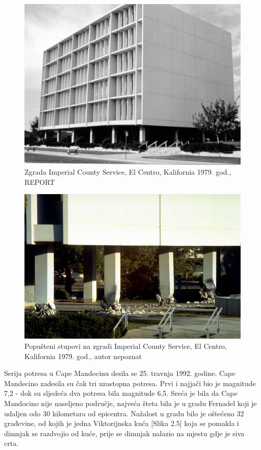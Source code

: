 \documentclass[12pt]{book}
\begin{document}
\begin{figure}[h]
	\centering
	\includegraphics[width=1\linewidth]{Slike/imperial_valley}
	\caption{Zgrada Imperial County Service, El Centro, Kalifornia 1979. god., REPORT}
	\label{fig:imperialvalley}
\end{figure}

\begin{figure}[h]
	\centering
	\includegraphics[width=1\linewidth]{Slike/imperial_valley_szupovi}
	\caption{Popušteni stupovi na zgradi Imperial County Service, El Centro, Kalifornia 1979. god., autor nepoznat}
	\label{fig:imperialvalleyszupovi}
\end{figure}

\newpage

Serija potresa u Cape Mandocinu desila se 25. travnja 1992. godine. Cape Mandecino zadesila su čak tri uzastopna potresa. Prvi i najjači bio je magnitude 7,2 - dok su sljedeća dva potresa bila magnitude 6,5. Sreća je bila da Cape Mandocino nije naseljeno područje, najveća šteta bila je u gradu Fernadel koji je udaljen odo 30 kilometara od epicentra. Nažalost u gradu bilo je oštećeno 32 građevine, od kojih je jedna Viktorijnska kuća [Slika 2.5] koja se pomakla i dimnjak se razdvojio od kuće, prije se dimnjak nalazio na mjestu gdje je siva crta.
\end{document}
